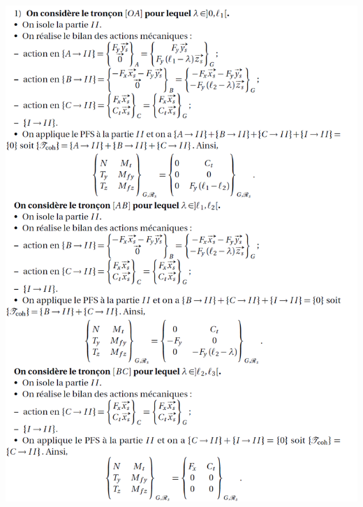 \documentclass[10pt,fleqn]{article} %
\begin{document}
\newpage
\begin{center}
\includegraphics[width=\linewidth]{images/cor_01}
\end{center}
\end{document}
